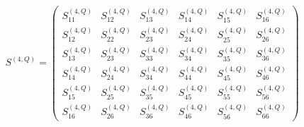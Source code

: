 \documentclass[fleqn,10pt]{jsarticle}
\begin{document}
\begin{align*}
S^{(4,Q)} = \begin{pmatrix} S^{(4,Q)}_{11} & S^{(4,Q)}_{12} & S^{(4,Q)}_{13} & S^{(4,Q)}_{14} & S^{(4,Q)}_{15} & S^{(4,Q)}_{16} \\ S^{(4,Q)}_{12} & S^{(4,Q)}_{22} & S^{(4,Q)}_{23} & S^{(4,Q)}_{24} & S^{(4,Q)}_{25} & S^{(4,Q)}_{26} \\ S^{(4,Q)}_{13} & S^{(4,Q)}_{23} & S^{(4,Q)}_{33} & S^{(4,Q)}_{34} & S^{(4,Q)}_{35} & S^{(4,Q)}_{36} \\ S^{(4,Q)}_{14} & S^{(4,Q)}_{24} & S^{(4,Q)}_{34} & S^{(4,Q)}_{44} & S^{(4,Q)}_{45} & S^{(4,Q)}_{46} \\ S^{(4,Q)}_{15} & S^{(4,Q)}_{25} & S^{(4,Q)}_{35} & S^{(4,Q)}_{45} & S^{(4,Q)}_{55} & S^{(4,Q)}_{56} \\ S^{(4,Q)}_{16} & S^{(4,Q)}_{26} & S^{(4,Q)}_{36} & S^{(4,Q)}_{46} & S^{(4,Q)}_{56} & S^{(4,Q)}_{66} \end{pmatrix}
\end{align*}
\end{document}
